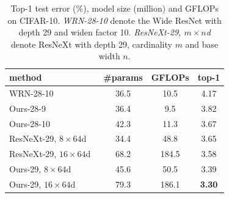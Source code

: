 \documentclass[10pt,twocolumn,letterpaper]{article}
\begin{document}
\begin{table}[]
\begin{small}
\centering
\caption{Top-1 test error ($\%$), model size (million) and GFLOPs on CIFAR-10. \textit{WRN-28-10} denote the Wide ResNet with depth 29 and widen factor 10. \textit{ResNeXt-29, $m\times n$d} denote ResNeXt with depth 29, cardinality $m$ and base width $n$. 
}
\label{table:cifar-comparison}
\begin{tabular} {lccc}%
\hline
method      		& \#params	& GFLOPs 	& top-1 \\
\hline
WRN-28-10~\cite{zagoruyko2016WRN}         	
					& 36.5 		& 10.5		& 4.17         \\   
Ours-28-9        	& 36.4		& 9.5		& 3.82	   	   \\ 
Ours-28-10    		& 42.3 		& 11.3 		& 3.67         \\
\hline  
ResNeXt-29, $8\times 64$d~\cite{xie2016aggregated}
					& 34.4  	& 48.8 		& 3.65        \\   
ResNeXt-29, $16\times 64$d~\cite{xie2016aggregated}  
					& 68.2  	& 184.5 	& 3.58        \\   
Ours-29, $8\times 64$d 		
					& 45.6  	& 50.5		& 3.39        \\ 
Ours-29, $16\times 64$d		
					& 79.3	  	& 186.1		& \textbf{3.30}    	        \\ 
\hline 
\end{tabular}
\end{small}
\vspace{-0.2em}
\end{table}
\end{document}
